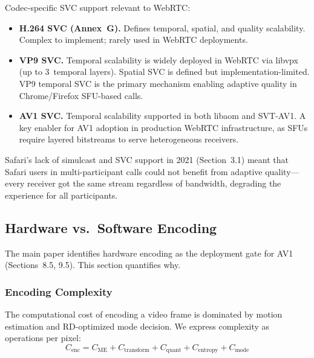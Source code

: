 Codec-specific SVC support relevant to WebRTC:

\begin{itemize}
\item \textbf{H.264 SVC (Annex~G).} Defines temporal, spatial, and quality
  scalability. Complex to implement; rarely used in WebRTC deployments.

\item \textbf{VP9 SVC.} Temporal scalability is widely deployed in WebRTC
  via libvpx (up to 3~temporal layers). Spatial SVC is defined but
  implementation-limited. VP9 temporal SVC is the primary mechanism
  enabling adaptive quality in Chrome/Firefox SFU-based calls.

\item \textbf{AV1 SVC.} Temporal scalability supported in both libaom and
  SVT-AV1. A key enabler for AV1 adoption in production WebRTC
  infrastructure, as SFUs require layered bitstreams to serve heterogeneous
  receivers.
\end{itemize}

Safari's lack of simulcast and SVC support in 2021 (Section~3.1) meant
that Safari users in multi-participant calls could not benefit from adaptive
quality---every receiver got the same stream regardless of bandwidth,
degrading the experience for all participants.

\subsection{Hardware vs.\ Software Encoding}
\label{sec:hw-sw}

The main paper identifies hardware encoding as the deployment gate for
AV1 (Sections~8.5, 9.5). This section quantifies why.

\subsubsection{Encoding Complexity}

The computational cost of encoding a video frame is dominated by motion
estimation and RD-optimized mode decision. We express complexity as
operations per pixel:
\begin{equation}
  C_{\text{enc}} = C_{\text{ME}} + C_{\text{transform}}
    + C_{\text{quant}} + C_{\text{entropy}}
    + C_{\text{mode}}
  \label{eq:enc-complexity}
\end{equation}

